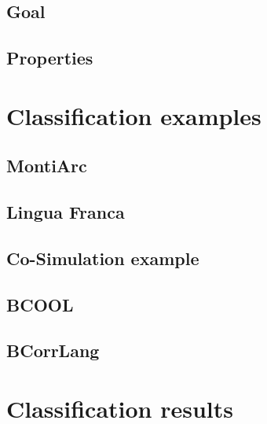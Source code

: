 \documentclass[runningheads]{llncs}
\begin{document}
\subsection{Goal}
\subsection{Properties}

\section{Classification examples} \label{sec:classifications}

\subsection{MontiArc} %
\subsection{Lingua Franca} %
\subsection{Co-Simulation example} %
\subsection{BCOOL} %
\subsection{BCorrLang} %

\section{Classification results}



\end{document}
